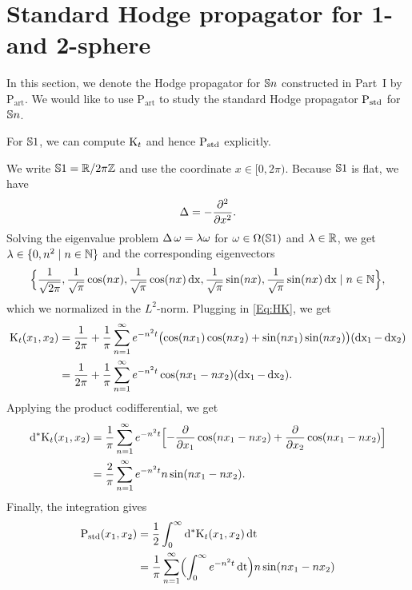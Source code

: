 \documentclass[\MainFolder/Text.tex]{subfiles}
\newcommand{\ArtPrpg}{\mathrm{P}_{\mathrm{art}}}
\begin{document}
\section{Standard Hodge propagator for 1- and 2-sphere}\label{Sec:GrSpgh}

In this section, we denote the Hodge propagator for $\mathbb{S}{n}$ constructed in Part~I by $\ArtPrpg$. We would like to use $\ArtPrpg$ to study the standard Hodge propagator $\mathrm{P}_{\mathrm{std}}$ for $\mathbb{S}{n}$.

For $\mathbb{S}{1}$, we can compute $\mathrm{K}_t$ and hence $\mathrm{P}_{\mathrm{std}}$ explicitly. 

\begin{Example}\label{Ex:SADQQ}
We write $\mathbb{S}{1} = \mathbb{R}/2\pi\mathbb{Z}$ and use the coordinate $x\in [0,2\pi)$. Because $\mathbb{S}{1}$ is flat, we have
$$ \operatorname{\Delta} = - \frac{\partial^2}{\partial x^2}. $$
Solving the eigenvalue problem $\operatorname{\Delta} \omega = \lambda \omega$ for $\omega\in \Omega(\mathbb{S}{1})$ and $\lambda\in \mathbb{R}$, we get $\lambda\in \{0, n^2 \mid n\in\mathbb{N}\}$ and the corresponding eigenvectors
\begin{align*}
\Bigl\{\frac{1}{\sqrt{2 \pi}}, \frac{1}{\sqrt{\pi}} \cos(nx), \frac{1}{\sqrt{\pi}} \cos(nx) \operatorname{dx}, \frac{1}{\sqrt{\pi}} \sin(nx), \frac{1}{\sqrt{\pi}} \sin(nx) \operatorname{dx} \mid n\in \mathbb{N}\Bigr\},
\end{align*}
which we normalized in the $L^2$-norm. Plugging in \eqref{Eq:HK}, we get
\begin{align*}
\mathrm{K}_t(x_1,x_2) & = \frac{1}{2\pi} + \frac{1}{\pi}\sum_{n=1}^\infty e^{-n^2 t}\bigl(\cos(nx_1) \cos(nx_2) + \sin(nx_1)\sin(nx_2) \bigr) (\operatorname{dx_1}-\operatorname{dx_2}) \\
& = \frac{1}{2\pi} + \frac{1}{\pi}\sum_{n=1}^\infty e^{-n^2 t}\cos(nx_1 - nx_2)(\operatorname{dx_1}-\operatorname{dx_2}).
\end{align*}
Applying the product codifferential, we get
\begin{align*}
\mathrm{d}^* \mathrm{K}_t(x_1,x_2) &= \frac{1}{\pi}\sum_{n=1}^\infty e^{-n^2 t}\Bigl[- \frac{\partial}{\partial x_1}\cos(nx_1-nx_2)+\frac{\partial}{\partial x_2}\cos(nx_1-nx_2)\Bigr] \\
& = \frac{2}{\pi} \sum_{n=1}^\infty e^{-n^2 t} n \sin(n x_1 - n x_2). 
\end{align*}
Finally, the integration gives
\begin{align*}
\StdPrpg(x_1,x_2) &= \frac{1}{2}\int_0^\infty \CoDd\KKer_t(x_1,x_2) \Diff{t} \\
&=\frac{1}{\pi}\sum_{n=1}^\infty \Bigl(\int_0^\infty e^{-n^2 t} \Diff{t}\Bigr)n\sin(nx_1 - nx_2) \\

\end{align*}
\end{Example}
\end{document}
